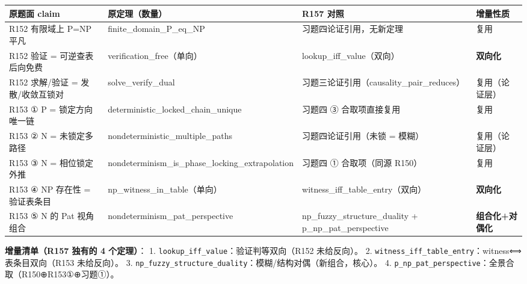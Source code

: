 \documentclass[
]{article}
\newcounter{none} %
\begin{document}
{\def\LTcaptype{none} %
\begin{longtable}[]{@{}
  >{\raggedright\arraybackslash}p{}
  >{\raggedright\arraybackslash}p{}
  >{\raggedright\arraybackslash}p{}
  >{\raggedright\arraybackslash}p{}@{}}
\toprule\noalign{}
\begin{minipage}[b]{\linewidth}\raggedright
原题面 claim
\end{minipage} & \begin{minipage}[b]{\linewidth}\raggedright
原定理（数量）
\end{minipage} & \begin{minipage}[b]{\linewidth}\raggedright
R157 对照
\end{minipage} & \begin{minipage}[b]{\linewidth}\raggedright
增量性质
\end{minipage} \\
\midrule\noalign{}
\endhead
\bottomrule\noalign{}
\endlastfoot
R152 有限域上 P=NP 平凡 & finite\_domain\_P\_eq\_NP &
习题四论证引用，无新定理 & 复用 \\
R152 验证 = 可逆查表后向免费 & verification\_free（单向） &
lookup\_iff\_value（双向） & \textbf{双向化} \\
R152 求解/验证 = 发散/收敛互锁对 & solve\_verify\_dual &
习题三论证引用（causality\_pair\_reduces） & 复用（论证层） \\
R153 ① P = 锁定方向唯一链 & deterministic\_locked\_chain\_unique &
习题四 ③ 合取项直接复用 & 复用 \\
R153 ② N = 未锁定多路径 & nondeterministic\_multiple\_paths &
习题四论证引用（未锁 = 模糊） & 复用（论证层） \\
R153 ③ N = 相位锁定外推 &
nondeterminism\_is\_phase\_locking\_extrapolation & 习题四 ①
合取项（同源 R150） & 复用 \\
R153 ④ NP 存在性 = 验证表条目 & np\_witness\_in\_table（单向） &
witness\_iff\_table\_entry（双向） & \textbf{双向化} \\
R153 ⑤ N 的 Pat 视角组合 & nondeterminism\_pat\_perspective &
np\_fuzzy\_structure\_duality + p\_np\_pat\_perspective &
\textbf{组合化+对偶化} \\
\end{longtable}
}

\textbf{增量清单（R157 独有的 4 个定理）}： 1.
\texttt{lookup\_iff\_value}：验证判等双向（R152 未给反向）。 2.
\texttt{witness\_iff\_table\_entry}：witness⟺表条目双向（R153
未给反向）。 3.
\texttt{np\_fuzzy\_structure\_duality}：模糊/结构对偶（新组合，核心）。
4. \texttt{p\_np\_pat\_perspective}：全景合取（R150⊕R153①⊕习题①）。
\end{document}
